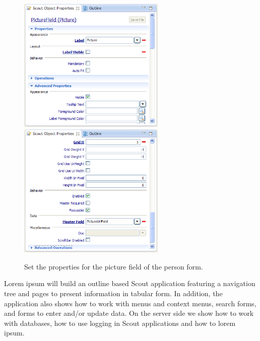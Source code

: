 \documentclass[a4paper,10pt,twoside]{book}
\begin{document}
\begin{figure}
\includegraphics[width=7cm]{picture_field_properties_1.png} \hspace{5mm}
\includegraphics[width=7cm]{picture_field_properties_2.png}
\caption{Set the properties for the picture field of the person form.}
\end{figure}

Lorem ipsum will build an outline based Scout application featuring a navigation tree and pages to present information in tabular form. 
In addition, the application also shows how to work with menus and context menus, search forms, and forms to enter and/or update data. 
On the server side we show how to work with databases, how to use logging in Scout applications and how to lorem ipsum. 
\end{document}

